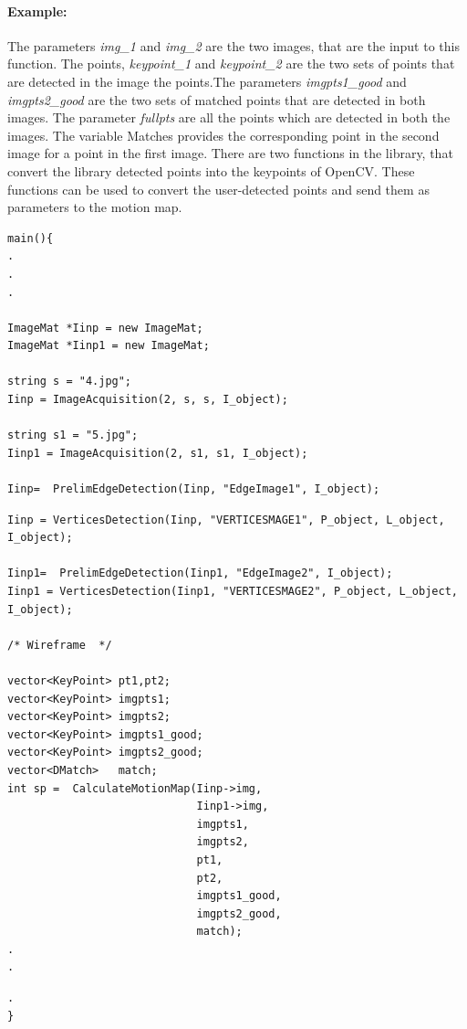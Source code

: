 \paragraph{Example:}
 The parameters \textit{img\_1} and \textit{img\_2} are the two images, that are the input to this function. The points, \textit{keypoint\_1} and \textit{keypoint\_2} are the two sets of points that are detected in the image the points.The parameters \textit{imgpts1\_good} and \textit{imgpts2\_good} are the two sets of matched points that are detected in both images. The parameter \textit{fullpts} are all the points which are detected in both the images. The variable Matches provides the corresponding point in the second image for a point in the first image. There are two functions in the library, that convert the library detected points into the keypoints of OpenCV. These functions can be used to convert the user-detected points and send them as parameters to the motion map.
\begin{lstlisting}
main(){  
.
. 
.

ImageMat *Iinp = new ImageMat;
ImageMat *Iinp1 = new ImageMat;

string s = "4.jpg";   
Iinp = ImageAcquisition(2, s, s, I_object);

string s1 = "5.jpg";
Iinp1 = ImageAcquisition(2, s1, s1, I_object);

Iinp=  PrelimEdgeDetection(Iinp, "EdgeImage1", I_object);
\end{lstlisting}
\pagebreak
\begin{lstlisting}
Iinp = VerticesDetection(Iinp, "VERTICESMAGE1", P_object, L_object, I_object);

Iinp1=  PrelimEdgeDetection(Iinp1, "EdgeImage2", I_object);
Iinp1 = VerticesDetection(Iinp1, "VERTICESMAGE2", P_object, L_object, I_object);

/* Wireframe  */

vector<KeyPoint> pt1,pt2;
vector<KeyPoint> imgpts1;
vector<KeyPoint> imgpts2;
vector<KeyPoint> imgpts1_good;
vector<KeyPoint> imgpts2_good;
vector<DMatch>   match;
int sp =  CalculateMotionMap(Iinp->img, 
							 Iinp1->img, 
							 imgpts1, 
							 imgpts2, 
							 pt1, 
							 pt2, 
							 imgpts1_good,
							 imgpts2_good,
							 match);
.
.
\end{lstlisting}
\pagebreak
\begin{lstlisting}
.
}
\end{lstlisting}

